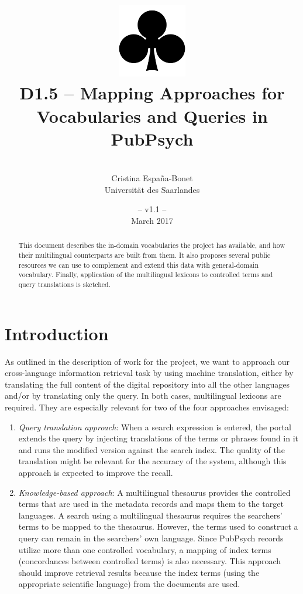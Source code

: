 \documentclass[a4paper,11pt]{article}
\title{
\includegraphics[width=3cm]{./img/200px-SuitClubs.png} \\
\Huge D1.5 -- Mapping Approaches for \\ Vocabularies and Queries in PubPsych }
\author{\vspace*{1cm}\\ \LARGE Cristina Espa\~na-Bonet \medskip \\ \Large Universit\"at des Saarlandes}
\date{\vspace*{2cm} -- v1.1 --\\March 2017}
\begin{document}
\clearpage\maketitle
\thispagestyle{empty}\thispagestyle{empty}

\vspace*{5cm}
\begin{abstract}
This document describes the in-domain vocabularies the project has available, and how their multilingual counterparts are built from them. It also proposes several public resources we can use to complement and extend this data with general-domain vocabulary. Finally, application of the multilingual lexicons to controlled terms and query translations is sketched. 
\end{abstract}

\newpage
\tableofcontents
\clearpage


\section{Introduction}
\label{s:intro}

As outlined in the description of work for the project, we want to approach our cross-language information retrieval task by using machine translation, either by translating the full content of the digital repository into all the other languages and/or by translating only the query. In both cases, multilingual lexicons are required. They are especially relevant for two of the four approaches envisaged:

\begin{enumerate}
 \item \emph{Query translation approach}: When a search expression is entered, the portal extends the query by injecting translations of the terms or phrases found in it and runs the modified version against the search index. The quality of the translation might be relevant for the accuracy of the system, although this approach is expected to improve the recall.

 \item \emph{Knowledge-based approach}: A multilingual thesaurus provides the controlled terms that are used in the metadata records and maps them to the target languages. A search using a multilingual thesaurus requires the searchers' terms to be mapped to the thesaurus. However, the terms used to construct a query can remain in the searchers' own language. Since PubPsych records utilize more than one controlled vocabulary, a mapping of index terms (concordances between controlled terms) is also necessary. This approach should improve retrieval results because the index terms (using the appropriate scientific language) from the documents are used. 
\end{enumerate}
\end{document}
